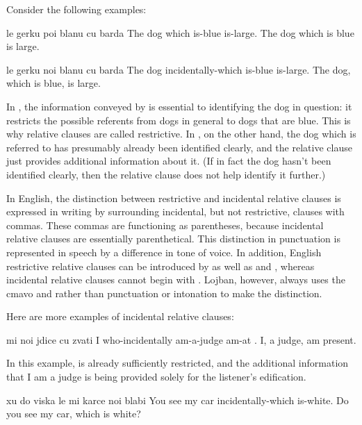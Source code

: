 Consider the following examples:
\begin{example}
le gerku poi blanu cu barda\n
The dog which is-blue is-large.\n
The dog which is blue is large.
\end{example}

\begin{example}
le gerku noi blanu cu barda\n
The dog incidentally-which is-blue is-large.\n
The dog, which is blue, is large.
\end{example}

In , the information conveyed
    by  is essential to identifying the dog in
    question: it restricts the possible referents from dogs in
    general to dogs that are blue. This is why  relative
    clauses are called restrictive. In , on the other hand, the dog which is referred to has
    presumably already been identified clearly, and the relative
    clause  just provides additional information about
    it. (If in fact the dog hasn't been identified clearly, then
    the relative clause does not help identify it further.)

In English, the distinction between restrictive and
    incidental relative clauses is expressed in writing by
    surrounding incidental, but not restrictive, clauses with
    commas. These commas are functioning as parentheses, because
    incidental relative clauses are essentially parenthetical. This
    distinction in punctuation is represented in speech by a
    difference in tone of voice. In addition, English restrictive
    relative clauses can be introduced by  as well as
     and , whereas incidental relative clauses
    cannot begin with . Lojban, however, always uses the
    cmavo  and  rather than punctuation or intonation
    to make the distinction.

Here are more examples of incidental relative clauses:
\begin{example}
mi noi jdice cu zvati\n
I who-incidentally am-a-judge am-at .\n
I, a judge, am present.
\end{example}

In this example,  is already sufficiently restricted,
    and the additional information that I am a judge is being
    provided solely for the listener's edification.
\begin{example}
xu do viska le mi karce noi blabi\n
{} You see my car incidentally-which is-white.\n
Do you see my car, which is white?
\end{example}

